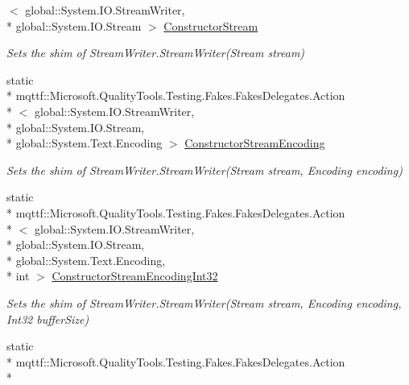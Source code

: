 \begin{DoxyCompactItemize}
$<$ global\-::\-System.\-I\-O.\-Stream\-Writer, \\*
global\-::\-System.\-I\-O.\-Stream $>$ \hyperlink{class_system_1_1_i_o_1_1_fakes_1_1_shim_stream_writer_ae72bbf1b495163689b121fc5abf3990f}{Constructor\-Stream}
\begin{DoxyCompactList}\small\item\em Sets the shim of Stream\-Writer.\-Stream\-Writer(\-Stream stream)\end{DoxyCompactList}\item 
static \\*
mqttf\-::\-Microsoft.\-Quality\-Tools.\-Testing.\-Fakes.\-Fakes\-Delegates.\-Action\\*
$<$ global\-::\-System.\-I\-O.\-Stream\-Writer, \\*
global\-::\-System.\-I\-O.\-Stream, \\*
global\-::\-System.\-Text.\-Encoding $>$ \hyperlink{class_system_1_1_i_o_1_1_fakes_1_1_shim_stream_writer_a325ab764e9e10584cb92052601adc345}{Constructor\-Stream\-Encoding}
\begin{DoxyCompactList}\small\item\em Sets the shim of Stream\-Writer.\-Stream\-Writer(\-Stream stream, Encoding encoding)\end{DoxyCompactList}\item 
static \\*
mqttf\-::\-Microsoft.\-Quality\-Tools.\-Testing.\-Fakes.\-Fakes\-Delegates.\-Action\\*
$<$ global\-::\-System.\-I\-O.\-Stream\-Writer, \\*
global\-::\-System.\-I\-O.\-Stream, \\*
global\-::\-System.\-Text.\-Encoding, \\*
int $>$ \hyperlink{class_system_1_1_i_o_1_1_fakes_1_1_shim_stream_writer_aabda7a399c6959af3f373cafa0205a21}{Constructor\-Stream\-Encoding\-Int32}
\begin{DoxyCompactList}\small\item\em Sets the shim of Stream\-Writer.\-Stream\-Writer(\-Stream stream, Encoding encoding, Int32 buffer\-Size)\end{DoxyCompactList}\item 
static \\*
mqttf\-::\-Microsoft.\-Quality\-Tools.\-Testing.\-Fakes.\-Fakes\-Delegates.\-Action\\*

\end{DoxyCompactItemize}
